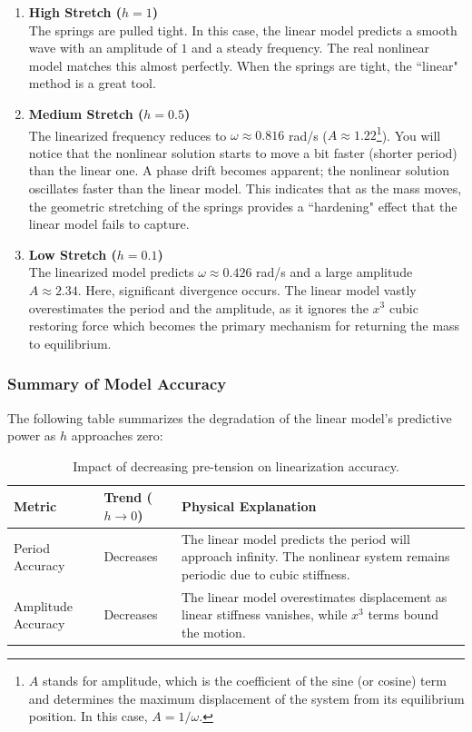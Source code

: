 \documentclass[12pt, a4paper]{report}
\begin{document}
	\begin{enumerate}[label=\textbf{Case \color{blue}\roman*.}]
		\item \textbf{High Stretch ($h = 1$)} \\
		The springs are pulled tight. In this case, the linear model predicts a smooth wave with an amplitude of $1$ and a steady frequency. The real nonlinear model matches this almost perfectly. When the springs are tight, the ``linear" method is a great tool.
		
		\item \textbf{Medium Stretch ($h = 0.5$)} \\
		The linearized frequency reduces to $\omega \approx 0.816$ rad/s ($A \approx 1.22$\footnote{$A$ stands for amplitude, which is the coefficient of the sine (or cosine) term and determines the maximum displacement of the system from its equilibrium position. In this case, $A = 1 / \omega$.}). You will notice that the nonlinear solution starts to move a bit faster (shorter period) than the linear one. A phase drift becomes apparent; the nonlinear solution oscillates faster than the linear model. This indicates that as the mass moves, the geometric stretching of the springs provides a ``hardening" effect that the linear model fails to capture.
		
		\item \textbf{Low Stretch ($h = 0.1$)} \\
		The linearized model predicts $\omega \approx 0.426$ rad/s and a large amplitude $A \approx 2.34$. Here, significant divergence occurs. The linear model vastly overestimates the period and the amplitude, as it ignores the $x^3$ cubic restoring force which becomes the primary mechanism for returning the mass to equilibrium.
	\end{enumerate}
	
	\subsubsection{Summary of Model Accuracy}
	
	The following table summarizes the degradation of the linear model's predictive power as $h$ approaches zero:
	
	\begin{table}[h]
		\centering
		\begin{tabular}{|l|m{3cm}|m{7cm}|}
			\hline
			\textbf{Metric} & \textbf{Trend ($h \to 0$)} & \textbf{Physical Explanation} \\ \hline
			
			Period Accuracy & Decreases &
			The linear model predicts the period will approach infinity. The nonlinear system remains periodic due to cubic stiffness. \\ \hline
			
			Amplitude Accuracy & Decreases &
			The linear model overestimates displacement as linear stiffness vanishes, while $x^3$ terms bound the motion. \\ \hline
			
		\end{tabular}
		\caption{Impact of decreasing pre-tension on linearization accuracy.}
	\end{table}
	
\end{document}
